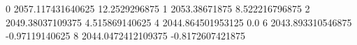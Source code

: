 0 2057.117431640625 12.2529296875
1 2053.38671875 8.522216796875
2 2049.38037109375 4.515869140625
4 2044.864501953125 0.0
6 2043.893310546875 -0.97119140625
8 2044.0472412109375 -0.8172607421875
